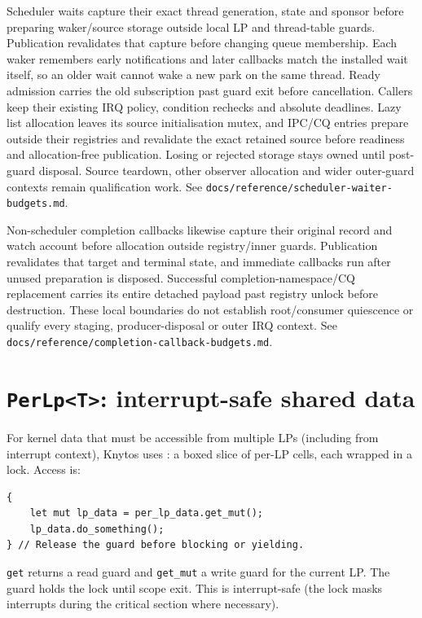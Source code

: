 Scheduler waits capture their exact thread generation, state and sponsor before
preparing waker/source storage outside local LP and thread-table guards.
Publication revalidates that capture before changing queue membership. Each
waker remembers early notifications and later callbacks match the installed
wait itself, so an older wait cannot wake a new park on the same thread. Ready
admission carries the old subscription past guard exit before cancellation.
Callers keep their existing IRQ policy, condition rechecks and absolute
deadlines. Lazy list allocation leaves its source initialisation mutex, and IPC/CQ
entries prepare outside their registries and revalidate the exact retained
source before readiness and allocation-free publication. Losing or rejected
storage stays owned until post-guard disposal. Source teardown, other observer
allocation and wider outer-guard contexts remain qualification work.
See \texttt{docs/reference/scheduler-waiter-budgets.md}.

Non-scheduler completion callbacks likewise capture their original record and
watch account before allocation outside registry/inner guards. Publication
revalidates that target and terminal state, and immediate callbacks run after
unused preparation is disposed. Successful completion-namespace/CQ replacement
carries its entire detached payload past registry unlock before destruction.
These local boundaries do not establish root/consumer quiescence or qualify
every staging, producer-disposal or outer IRQ context. See
\texttt{docs/reference/completion-callback-budgets.md}.

\section{\texttt{PerLp<T>}: interrupt-safe shared data}

\label{sec:per-lp}

For kernel data that must be accessible from multiple LPs (including from
interrupt context), Knytos uses : a boxed slice of
per-LP cells, each wrapped in a lock. Access is:

\begin{lstlisting}[style=rustCode]
{
    let mut lp_data = per_lp_data.get_mut();
    lp_data.do_something();
} // Release the guard before blocking or yielding.
\end{lstlisting}

\texttt{get} returns a read guard and \texttt{get\_mut} a write guard for the
current LP. The guard holds the lock until scope exit. This is interrupt-safe
(the lock masks interrupts during the critical section where necessary).

